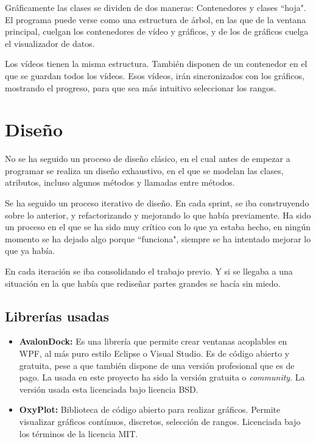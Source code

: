 Gr\'aficamente las clases se dividen de dos maneras: Contenedores y clases ``hoja".
El programa puede verse como una estructura de \'arbol, en las que de la ventana principal,
cuelgan los contenedores de v\'ideo y gr\'aficos, y de los de gr\'aficos cuelga el 
visualizador de datos.

Los v\'ideos tienen la misma estructura. Tambi\'en disponen de un contenedor en el que se
guardan todos los v\'ideos. Esos v\'ideos, ir\'an sincronizados con los gr\'aficos, mostrando
el progreso, para que sea m\'as intuitivo seleccionar los rangos.

\section{Dise\~{n}o}
No se ha seguido un proceso de dise\~no cl\'asico, en el cual antes de empezar a programar se realiza
un dise\~no exhaustivo, en el que se modelan las clases, atributos, incluso algunos m\'etodos y
llamadas entre m\'etodos.

Se ha seguido un proceso iterativo de dise\~no. En cada sprint, se iba construyendo sobre lo anterior, y refactorizando
y mejorando lo que hab\'ia previamente. Ha sido un proceso en el que se ha sido muy cr\'itico con lo que ya estaba
hecho, en ning\'un momento se ha dejado algo porque ``funciona", siempre se ha intentado mejorar lo que ya hab\'ia.

En cada iteraci\'on se iba consolidando el trabajo previo. Y si se llegaba a una situaci\'on en la que hab\'ia que redise\~nar
partes grandes se hac\'ia sin miedo.

\subsection{Librer\'{i}as usadas}
\begin{itemize}
    \item \textbf{AvalonDock:} 
    Es una librer\'{i}a que permite crear ventanas acoplables en WPF, al m\'as puro estilo Eclipse o Visual Studio. Es de
    c\'{o}digo abierto y gratuita, pese a que tambi\'{e}n dispone de una versi\'{o}n profesional que es de pago. La usada en este proyecto
    ha sido la versi\'{o}n gratuita o \emph{community}. La versi\'{o}n usada esta licenciada bajo licencia BSD.
    \item \textbf{OxyPlot:}
    Biblioteca de c\'odigo abierto para realizar gr\'aficos. Permite visualizar gr\'aficos cont\'inuos, discretos, 
    selecci\'on de rangos. Licenciada bajo los t\'erminos de la licencia MIT.
\end{itemize}

